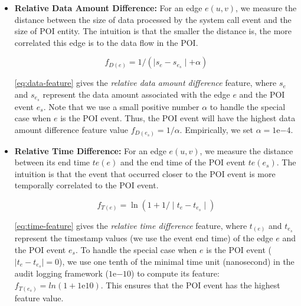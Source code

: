 \begin{itemize}[noitemsep, topsep=1pt, partopsep=1pt, listparindent=\parindent, leftmargin=*]

\item \textbf{Relative Data Amount Difference:}
For an edge $e(u, v)$, we measure the distance between the size of data processed by the system call event and the size of POI entity.
The intuition is that the smaller the distance is, the more correlated
this edge is to the data flow in the POI.

\vspace*{-2ex}
\begin{equation}
\label{eq:data-feature}
    f_{D(e)} = 1/(\mid s_{e} - s_{e_s}\mid + \alpha)
\end{equation}

\cref{eq:data-feature} gives the \emph{relative data amount difference} feature,
where $s_{e}$ and $s_{e_s}$ represent the data amount associated with the edge $e$ and the POI event $e_s$.
Note that
we use a small positive number $\alpha$ to handle the special case when $e$ is the POI event. Thus, the POI event will have the highest data amount difference feature value $f_{D(e_s)} = 1/\alpha$. Empirically, we set $\alpha = 1\mathrm{e}{-4}$.


\item \textbf{Relative Time Difference:}
For an edge $e(u,v)$, we measure the distance between its end time $te(e)$ and the end time of the POI event $te(e_s)$.
The intuition is that the event that occurred closer to the POI event is more temporally correlated to the POI event.

\vspace*{-2ex}
\begin{equation}
\label{eq:time-feature}
    f_{T(e)} = \ln(1 + 1/\mid t_{e} - t_{e_s}\mid)
\end{equation}

\cref{eq:time-feature} gives the \emph{relative time difference} feature, where $t_{(e)}$ and $t_{e_s}$ represent the timestamp values (we use the event end time)
of the edge $e$ and the POI event $e_s$. 
To handle the special case when $e$ is the POI event (\ie $\mid t_{e} - t_{e_s}\mid = 0$), we use one tenth of the minimal time unit (nanosecond) in the audit logging framework (\ie $1\mathrm{e}{-10}$) to compute its feature: $f_{T(e_s)} = ln(1 + 1\mathrm{e}{10})$. This ensures that the POI event has the highest feature value.


\end{itemize}
